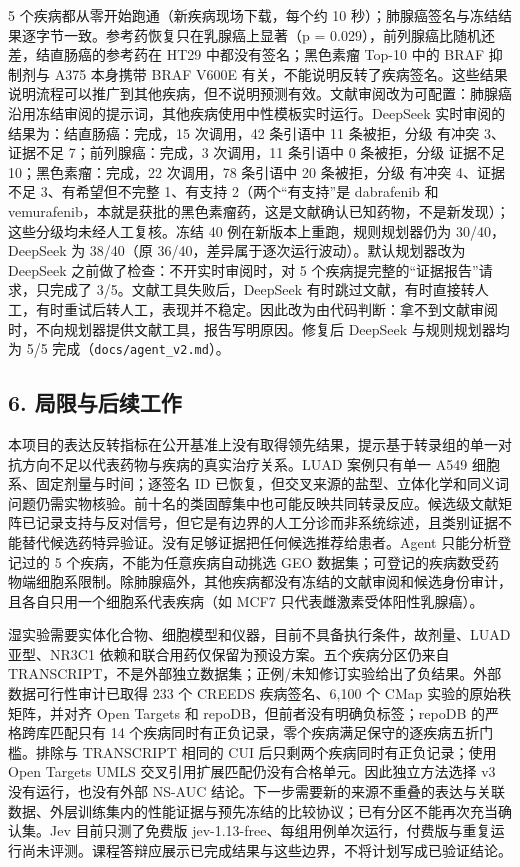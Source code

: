 \documentclass[
  10pt,
]{ctexart}
\begin{document}
5 个疾病都从零开始跑通（新疾病现场下载，每个约 10
秒）；肺腺癌签名与冻结结果逐字节一致。参考药恢复只在乳腺癌上显著（p =
0.029），前列腺癌比随机还差，结直肠癌的参考药在 HT29
中都没有签名；黑色素瘤 Top-10 中的 BRAF 抑制剂与 A375 本身携带 BRAF
V600E
有关，不能说明反转了疾病签名。这些结果说明流程可以推广到其他疾病，但不说明预测有效。文献审阅改为可配置：肺腺癌沿用冻结审阅的提示词，其他疾病使用中性模板实时运行。DeepSeek
实时审阅的结果为：结直肠癌：完成，15 次调用，42 条引语中 11 条被拒，分级
有冲突 3、证据不足 7；前列腺癌：完成，3 次调用，11 条引语中 0
条被拒，分级 证据不足 10；黑色素瘤：完成，22 次调用，78 条引语中 20
条被拒，分级 有冲突 4、证据不足 3、有希望但不完整 1、有支持
2（两个``有支持''是 dabrafenib 和
vemurafenib，本就是获批的黑色素瘤药，这是文献确认已知药物，不是新发现）；这些分级均未经人工复核。冻结
40 例在新版本上重跑，规则规划器仍为 30/40，DeepSeek 为 38/40（原
36/40，差异属于逐次运行波动）。默认规划器改为 DeepSeek
之前做了检查：不开实时审阅时，对 5
个疾病提完整的``证据报告''请求，只完成了 3/5。文献工具失败后，DeepSeek
有时跳过文献，有时直接转人工，有时重试后转人工，表现并不稳定。因此改为由代码判断：拿不到文献审阅时，不向规划器提供文献工具，报告写明原因。修复后
DeepSeek 与规则规划器均为 5/5 完成（\texttt{docs/\allowbreak{}agent\_\allowbreak{}v2.\allowbreak{}md}）。

\subsection{6.
局限与后续工作}\label{6-ux5c40ux9650ux4e0eux540eux7eedux5de5ux4f5c}

本项目的表达反转指标在公开基准上没有取得领先结果，提示基于转录组的单一对抗方向不足以代表药物与疾病的真实治疗关系。LUAD
案例只有单一 A549 细胞系、固定剂量与时间；逐签名 ID
已恢复，但交叉来源的盐型、立体化学和同义词问题仍需实物核验。前十名的类固醇集中也可能反映共同转录反应。候选级文献矩阵已记录支持与反对信号，但它是有边界的人工分诊而非系统综述，且类别证据不能替代候选药特异验证。没有足够证据把任何候选推荐给患者。Agent
只能分析登记过的 5 个疾病，不能为任意疾病自动挑选 GEO
数据集；可登记的疾病数受药物端细胞系限制。除肺腺癌外，其他疾病都没有冻结的文献审阅和候选身份审计，且各自只用一个细胞系代表疾病（如
MCF7 只代表雌激素受体阳性乳腺癌）。

湿实验需要实体化合物、细胞模型和仪器，目前不具备执行条件，故剂量、LUAD
亚型、NR3C1 依赖和联合用药仅保留为预设方案。五个疾病分区仍来自
TRANSCRIPT，不是外部独立数据集；正例/未知修订实验给出了负结果。外部数据可行性审计已取得
233 个 CREEDS 疾病签名、6,100 个 CMap 实验的原始秩矩阵，并对齐 Open
Targets 和 repoDB，但前者没有明确负标签；repoDB 的严格跨库匹配只有 14
个疾病同时有正负记录，零个疾病满足保守的逐疾病五折门槛。排除与
TRANSCRIPT 相同的 CUI 后只剩两个疾病同时有正负记录；使用 Open Targets
UMLS 交叉引用扩展匹配仍没有合格单元。因此独立方法选择 v3
没有运行，也没有外部 NS-AUC
结论。下一步需要新的来源不重叠的表达与关联数据、外层训练集内的性能证据与预先冻结的比较协议；已有分区不能再次充当确认集。Jev
目前只测了免费版
jev-1.13-free、每组用例单次运行，付费版与重复运行尚未评测。课程答辩应展示已完成结果与这些边界，不将计划写成已验证结论。
\end{document}
